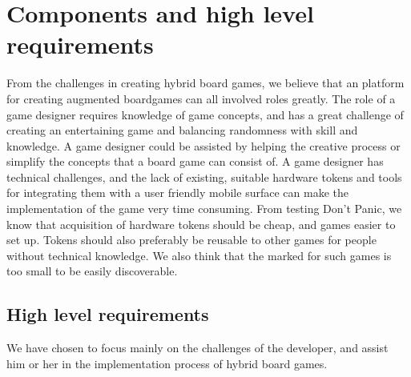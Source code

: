 \section{Components and high level requirements}
\label{sec:high_level_requirements}

From the challenges in creating hybrid board games, we believe that an platform for creating augmented boardgames can all involved roles greatly. The role of a game designer requires knowledge of game concepts, and has a great challenge of creating an entertaining game and balancing randomness with skill and knowledge. A game designer could be assisted by helping the creative process or simplify the concepts that a board game can consist of. A game designer has technical challenges, and the lack of existing, suitable hardware tokens and tools for integrating them with a user friendly mobile surface can make the implementation of the game very time consuming. From testing Don't Panic, we know that acquisition of hardware tokens should be cheap, and games easier to set up. Tokens should also preferably be reusable to other games for people without technical knowledge. We also think that the marked for such games is too small to be easily discoverable.

\subsection{High level requirements}

We have chosen to focus mainly on the challenges of the developer, and assist him or her in the implementation process of hybrid board games.

